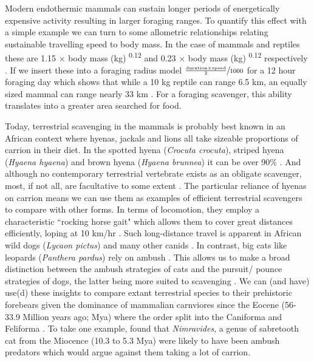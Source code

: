 \documentclass[a4paper,12pt]{article}
\begin{document}
Modern endothermic mammals can sustain longer periods of energetically expensive activity \citep{bennett1979endothermy} resulting in larger foraging ranges. 
To quantify this effect with a simple example we can turn to some allometric relationships relating sustainable travelling speed to body mass.
In the case of mammals and reptiles these are 1.15 $\times$ body mass (kg) \textsuperscript{0.12} and 0.23 $\times$ body mass (kg) \textsuperscript{0.12} respectively \citep{ruxton2004obligate}.
If we insert these into a foraging radius model $\sfrac{\frac{\text{duration} \times \text{speed}}{2}}{1000}$ for a 12 hour foraging day which shows that while a 10 kg reptile can range 6.5 km, an equally sized mammal can range nearly 33 km \citep{Enstipp2006Energetics}. 
For a foraging scavenger, this ability translates into a greater area searched for food. 

Today, terrestrial scavenging in the mammals is probably best known in an African context where hyenas, jackals and lions all take sizeable proportions of carrion in their diet.
In the spotted hyena (\textit{Crocuta crocuta}), striped hyena (\textit{Hyaena hyaena}) and brown hyena (\textit{Hyaena brunnea}) it can be over 90\% \citep{jones2015african}.
And although no contemporary terrestrial vertebrate exists as an obligate scavenger, most, if not all, are facultative to some extent \citep{beasley2015vertebrates}.
The particular reliance of hyenas on carrion means we can use them as examples of efficient terrestrial scavengers to compare with other forms. 
In terms of locomotion, they employ a characteristic ``rocking horse gait"  which allows them to cover great distances efficiently, loping at 10 km/hr \citep{mills1989comparative,jones2015african}. 
Such long-distance travel is apparent in African wild dogs (\textit{Lycaon pictus}) and many other canids \citep{pennycuick1995radius,janis2014forelimb}. 
In contrast, big cats like leopards (\textit{Panthera pardus}) rely on ambush \citep{pennycuick1995radius}. 
This allows us to make a broad distinction between the ambush strategies of cats and the pursuit/ pounce strategies of dogs, the latter being more suited to scavenging \citep{janis2014forelimb}. 
We can (and have) use(d) these insights to compare extant terrestrial species to their prehistoric forebears given the dominance of mammalian carnviores since the Eocene (56-33.9 Million years ago; Mya) where the order split into the Caniforma and Feliforma \citep{van1987skeletal}.
To take one example, \cite{anyonge1996locomotor} found that \textit{Nimravides}, a genus of sabretooth cat from the Miocence (10.3 to 5.3 Mya) were likely to have been ambush predators which would argue against them taking a lot of carrion. 
\end{document}

